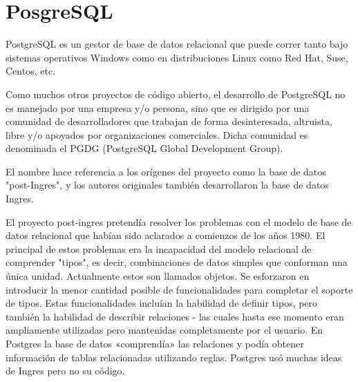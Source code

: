 \section{PosgreSQL}

PostgreSQL es un gestor de base de datos relacional que puede correr tanto bajo
sistemas operativos Windows como en distribuciones Linux como Red Hat, Suse,
Centos, etc.

Como muchos otros proyectos de código abierto, el desarrollo de PostgreSQL
no es manejado por una empresa y/o persona, sino que es dirigido por una comunidad
de desarrolladores que trabajan de forma desinteresada, altruista, libre y/o
apoyados por organizaciones comerciales. Dicha comunidad es denominada
el PGDG (PostgreSQL Global Development Group).

El nombre hace referencia a los orígenes del proyecto como la base de datos
"post-Ingres", y los autores originales también desarrollaron la base de datos Ingres.

El proyecto post-ingres pretendía resolver los problemas con el modelo de base
de datos relacional que habían sido aclarados a comienzos de los años 1980. El
principal de estos problemas era la incapacidad del modelo relacional de
comprender "tipos", es decir, combinaciones de datos simples que conforman una
única unidad. Actualmente estos son llamados objetos. Se esforzaron en introducir
la menor cantidad posible de funcionalidades para completar el soporte de tipos.
Estas funcionalidades incluían la habilidad de definir tipos, pero también
la habilidad de describir relaciones - las cuales hasta ese momento eran
ampliamente utilizadas pero mantenidas completamente por el usuario. En Postgres
la base de datos «comprendía» las relaciones y podía obtener información de
tablas relacionadas utilizando reglas. Postgres usó muchas ideas de Ingres
pero no su código.
